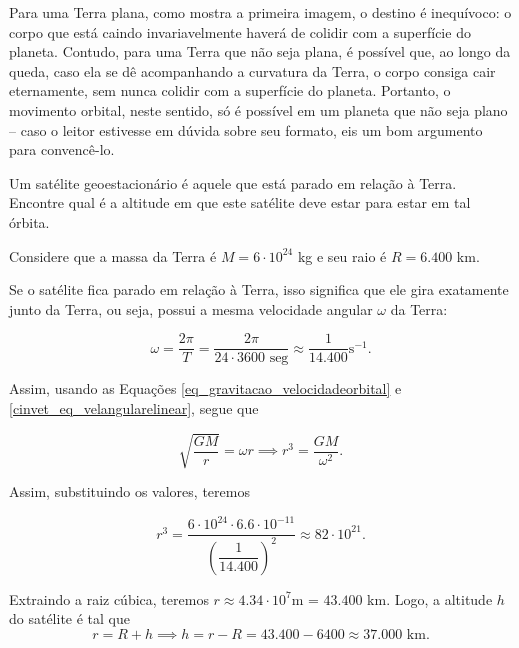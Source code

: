 Para uma Terra plana, como mostra a primeira imagem, o destino é inequívoco: o corpo que está caindo invariavelmente haverá de colidir com a superfície do planeta. Contudo, para uma Terra que não seja plana, é possível que, ao longo da queda, caso ela se dê acompanhando a curvatura da Terra, o corpo consiga cair eternamente, sem nunca colidir com a superfície do planeta. Portanto, o movimento orbital, neste sentido, só é possível em um planeta que não seja plano -- caso o leitor estivesse em dúvida sobre seu formato, eis um bom argumento para convencê-lo.



\vspace{0.3cm}

\begin{exemplo}[Nível I]\label{exemplo_gravitacao_velocidadeorbitalex01}

Um satélite geoestacionário é aquele que está parado em relação à Terra. Encontre qual é a altitude em que este satélite deve estar para estar em tal órbita.

Considere que a massa da Terra é $M=6 \cdot 10^{24}$ kg e seu raio é $R=6.400$ km.

\resolucao

Se o satélite fica parado em relação à Terra, isso significa que ele gira exatamente junto da Terra, ou seja, possui a mesma velocidade angular $\omega$ da Terra:

$$ \omega = \dfrac{2 \pi}{T} = \dfrac{2 \pi}{24 \cdot 3600 \text{ seg}} \approx \dfrac{1}{14.400} \text{s}^{-1}.$$

Assim, usando as Equações \eqref{eq_gravitacao_velocidadeorbital} e \eqref{cinvet_eq_velangularelinear}, segue que

$$ \sqrt{\dfrac{GM}{r}} = \omega r \implies r^3 = \dfrac{GM}{\omega^2}.$$

Assim, substituindo os valores, teremos

$$ r^3 = \dfrac{6 \cdot 10^{24}  \cdot 6.6 \cdot 10^{-11}}{\left( \dfrac{1}{14.400} \right)^2} \approx 82 \cdot 10^{21}.$$

Extraindo a raiz cúbica, teremos $r \approx 4.34 \cdot 10^{7}$m = $43.400$ km. Logo, a altitude $h$ do satélite é tal que 
$$r=R+h \implies h = r-R = 43.400 - 6400 \approx \boxed{37.000 \text{ km}.} $$


\end{exemplo}

\vspace{0.3cm}

